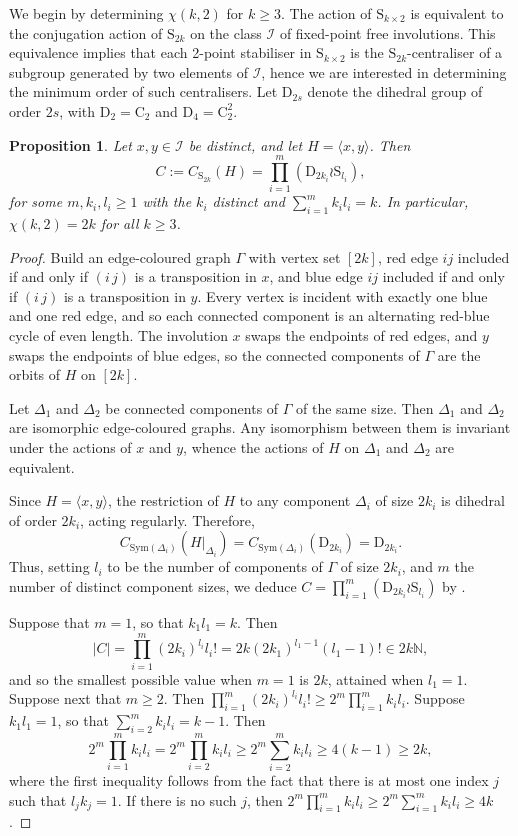 \documentclass{daj}
\renewcommand\S{\mathrm{S}}
\theoremstyle{plain}
\newtheorem{proposition}[theorem]{Proposition}
\theoremstyle{definition}
\begin{document}
 We begin by determining $\chi(k,2)$ for $k\geq 3$. The action of $\S_{k\times 2}$ is equivalent to the conjugation action of $\mathrm{S}_{2k}$ on the class $\mathcal{I}$ of fixed-point free involutions.  
This equivalence implies that each 2-point stabiliser in $\S_{k\times 2}$ is the $\S_{2k}$-centraliser of a subgroup generated by two elements of $\mathcal{I}$, hence we are interested in determining the minimum order of such centralisers. Let $\mathrm{D}_{2s}$ denote the dihedral group of order $2s$, with $\mathrm{D}_2=\mathrm{C}_2$ and $\mathrm{D}_4=\mathrm{C}_2^2$.
\begin{proposition}\label{di}
Let $x,y\in \mathcal{I}$ be distinct, and let $H=\langle x,y\rangle$. Then $$C:=C_{\S_{2k}}(H)=\prod_{i=1}^m(\mathrm{D}_{2k_i}\wr \S_{l_i}),$$ for some $m,k_i,l_i\geq 1$ with the $k_i$ distinct and $\sum_{i=1}^m k_il_i=k$. In particular, $\chi(k,2)=2k$ for all $k\geq 3$.
\end{proposition}




\begin{proof}
Build an edge-coloured graph $\Gamma$ with vertex set $[2k]$, red edge $ij$ included if and only if $(i\,j)$ is a transposition in $x$, and blue edge $ij$ included if and only if $(i\,j)$ is a transposition in $y$. Every vertex is incident with exactly one blue and one red edge, and so each connected component is an alternating red-blue cycle of even length. The involution $x$ swaps the endpoints of red edges, and $y$ swaps the endpoints of blue edges, so the connected components of $\Gamma$ are the orbits of $H$ on $[2k]$. 

Let $\Delta_1$ and $\Delta_2$ be connected components of $\Gamma$ of the same size. Then $\Delta_1$ and $\Delta_2$ are isomorphic edge-coloured graphs. Any isomorphism between them is invariant under the actions of $x$ and $y$, whence the actions of $H$ on $\Delta_1$ and $\Delta_2$ are equivalent. 

Since $H=\langle x,y\rangle$, the restriction of $H$ to any component $\Delta_i$ of size $2k_i$ is dihedral of order $2k_i$, acting regularly. Therefore, $$C_{\mathrm{Sym}(\Delta_i)}(H|_{\Delta_i})=C_{\mathrm{Sym}(\Delta_i)}(\mathrm{D}_{2k_i})=\mathrm{D}_{2k_i}.$$ Thus, setting $l_i$ to be the number of components of $\Gamma$ of size $2k_i$, and $m$ the number of distinct component sizes, we deduce $C=\prod_{i=1}^m(\mathrm{D}_{2k_i}\wr \S_{l_i})$ by \cite[Lemma 6.1.8]{ser}.

Suppose that $m=1$, so that $k_1l_1=k$. Then $$|C|=\prod_{i=1}^m(2k_i)^{l_i}l_i!=2k(2k_1)^{l_1-1}(l_1-1)!\in 2k\mathbb{N},$$ and so the smallest possible value when $m=1$ is $2k$, attained when $l_1=1$. Suppose next that $m\geq 2$. Then $\prod_{i=1}^m(2k_i)^{l_i}l_i!\geq 2^m\prod_{i=1}^mk_il_i$. Suppose $k_1l_1=1$, so that $\sum_{i=2}^mk_il_i=k-1$. Then $$2^m\prod_{i=1}^mk_il_i=2^m\prod_{i=2}^mk_il_i\geq2^m\sum_{i=2}^mk_il_i\geq4(k-1)\geq2k,$$ where the first inequality follows from the fact that there is at most one index $j$ such that $l_jk_j=1$. If there is no such $j$, then $2^m\prod_{i=1}^mk_il_i\geq2^m\sum_{i=1}^mk_il_i\geq4k$.
\end{proof}
\end{document}
